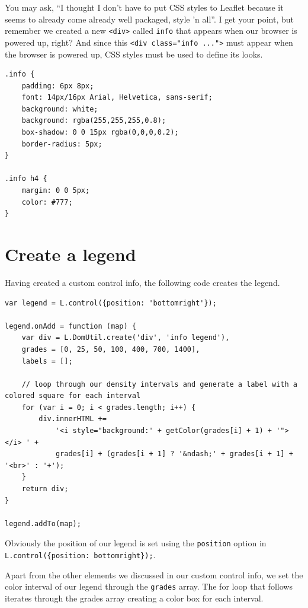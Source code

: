 \documentclass[
]{book}
\begin{document}
You may ask, ``I thought I don't have to put CSS styles to Leaflet because it seems to already come already well packaged, style 'n all''. I get your point, but remember we created a new \texttt{\textless{}div\textgreater{}} called \texttt{info} that appears when our browser is powered up, right? And since this \texttt{\textless{}div\ class="info\ ..."\textgreater{}} must appear when the browser is powered up, CSS styles must be used to define its looks.

\begin{verbatim}
.info {
    padding: 6px 8px;
    font: 14px/16px Arial, Helvetica, sans-serif;
    background: white;
    background: rgba(255,255,255,0.8);
    box-shadow: 0 0 15px rgba(0,0,0,0.2);
    border-radius: 5px;
}

.info h4 {
    margin: 0 0 5px;
    color: #777;
}
\end{verbatim}

\hypertarget{create-a-legend}{%
\section{Create a legend}\label{create-a-legend}}

Having created a custom control info, the following code creates the legend.

\begin{verbatim}
var legend = L.control({position: 'bottomright'});

legend.onAdd = function (map) {
    var div = L.DomUtil.create('div', 'info legend'),
    grades = [0, 25, 50, 100, 400, 700, 1400],
    labels = [];

    // loop through our density intervals and generate a label with a colored square for each interval
    for (var i = 0; i < grades.length; i++) {
        div.innerHTML += 
            '<i style="background:' + getColor(grades[i] + 1) + '"></i> ' + 
            grades[i] + (grades[i + 1] ? '&ndash;' + grades[i + 1] + '<br>' : '+');
    }
    return div;
}

legend.addTo(map);
\end{verbatim}

Obviously the position of our legend is set using the \texttt{position} option in \texttt{L.control(\{position:\ \textquotesingle{}bottomright\textquotesingle{}\});}.

Apart from the other elements we discussed in our custom control info, we set the color interval of our legend through the \texttt{grades} array. The for loop that follows iterates through the grades array creating a color box for each interval.
\end{document}
